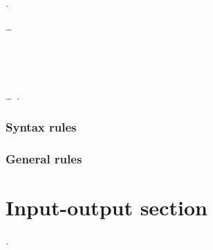\begin{syntax}
  .

  \begin{0-1}
    \begin{1=}
      \begin{1=}
        \begin{1=}
          \functionname
        \end{1=}\ldots \\

      \end{1=}
       \\

       \functionname
      \begin{0-1}
         \literal
      \end{0-1} \\

       \programname
      \begin{0-1}
         \literal
      \end{0-1}
    \end{1=}\ldots\ {}.
  \end{0-1}
\end{syntax}

\subsubsection{Syntax rules}

\subsubsection{General rules}

\section{Input-output section}

\begin{syntax}
  \begin{0-1}
     .
  \end{0-1}\newline
  \begin{0-1}
  \end{0-1}\newline
  \begin{0-1}
  \end{0-1}
\end{syntax}


